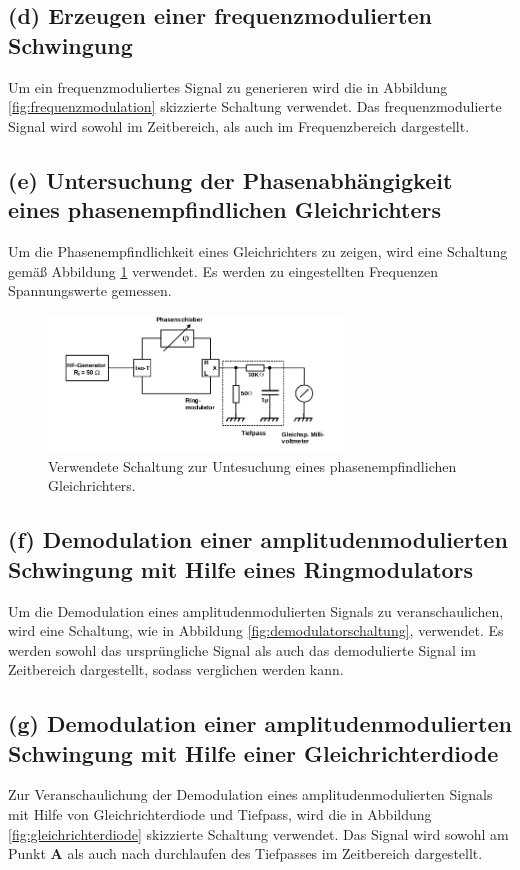 \FloatBarrier
\subsection{(d) Erzeugen einer frequenzmodulierten Schwingung}
\label{subsec:durchfuehrung_d}
Um ein frequenzmoduliertes Signal zu generieren wird die in Abbildung
\ref{fig:frequenzmodulation} skizzierte Schaltung verwendet.
Das frequenzmodulierte Signal wird sowohl im Zeitbereich, als auch
im Frequenzbereich dargestellt.


\FloatBarrier
\subsection{(e) Untersuchung der Phasenabhängigkeit eines
phasenempfindlichen Gleichrichters}
\label{subsec:durchfuehrung_e}
Um die Phasenempfindlichkeit eines Gleichrichters zu zeigen,
wird eine Schaltung gemäß Abbildung \ref{fig:schaltung_e} verwendet.
Es werden zu eingestellten Frequenzen Spannungswerte gemessen.

\begin{figure}
  \centering
  \includegraphics[width=0.7\textwidth]{figures/e_d.png}
  \caption{Verwendete Schaltung zur Untesuchung eines phasenempfindlichen Gleichrichters.\cite{sample}}
  \label{fig:schaltung_e}
\end{figure}


\FloatBarrier
\subsection{(f) Demodulation einer amplitudenmodulierten Schwingung
mit Hilfe eines Ringmodulators}
\label{subsec:durchfuehrung_f}
Um die Demodulation eines amplitudenmodulierten Signals zu veranschaulichen,
wird eine Schaltung, wie in Abbildung \ref{fig:demodulatorschaltung},
verwendet. Es werden sowohl das ursprüngliche Signal als auch das
demodulierte Signal im Zeitbereich dargestellt, sodass verglichen werden kann.


\FloatBarrier
\subsection{(g) Demodulation einer amplitudenmodulierten Schwingung
mit Hilfe einer Gleichrichterdiode}
\label{subsec:durchfuehrung_g}
Zur Veranschaulichung der Demodulation eines amplitudenmodulierten Signals
mit Hilfe von Gleichrichterdiode und Tiefpass, wird die in Abbildung
\ref{fig:gleichrichterdiode} skizzierte Schaltung verwendet.
Das Signal wird sowohl am Punkt \textbf{A} als auch nach durchlaufen des Tiefpasses
im Zeitbereich dargestellt.


